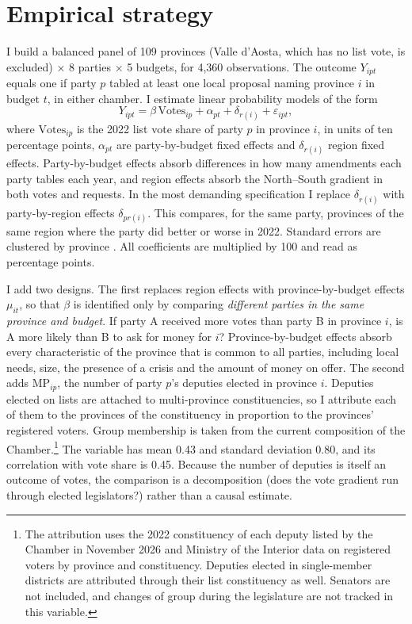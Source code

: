 \documentclass[12pt]{article}
\begin{document}
\section{Empirical strategy}\label{sec:strategy}

I build a balanced panel of 109 provinces (Valle d'Aosta, which has no list vote, is excluded) $\times$ 8 parties $\times$ 5 budgets, for 4,360 observations. The outcome $Y_{ipt}$ equals one if party $p$ tabled at least one local proposal naming province $i$ in budget $t$, in either chamber. I estimate linear probability models of the form
\begin{equation}
Y_{ipt} = \beta\, \text{Votes}_{ip} + \alpha_{pt} + \delta_{r(i)} + \varepsilon_{ipt},
\end{equation}
where $\text{Votes}_{ip}$ is the 2022 list vote share of party $p$ in province $i$, in units of ten percentage points, $\alpha_{pt}$ are party-by-budget fixed effects and $\delta_{r(i)}$ region fixed effects. Party-by-budget effects absorb differences in how many amendments each party tables each year, and region effects absorb the North--South gradient in both votes and requests. In the most demanding specification I replace $\delta_{r(i)}$ with party-by-region effects $\delta_{pr(i)}$. This compares, for the same party, provinces of the same region where the party did better or worse in 2022. Standard errors are clustered by province \citep{cameron2015}. All coefficients are multiplied by 100 and read as percentage points.

I add two designs. The first replaces region effects with province-by-budget effects $\mu_{it}$, so that $\beta$ is identified only by comparing \emph{different parties in the same province and budget}. If party A received more votes than party B in province $i$, is A more likely than B to ask for money for $i$? Province-by-budget effects absorb every characteristic of the province that is common to all parties, including local needs, size, the presence of a crisis and the amount of money on offer. The second adds $\text{MP}_{ip}$, the number of party $p$'s deputies elected in province $i$. Deputies elected on lists are attached to multi-province constituencies, so I attribute each of them to the provinces of the constituency in proportion to the provinces' registered voters. Group membership is taken from the current composition of the Chamber.\footnote{The attribution uses the 2022 constituency of each deputy listed by the Chamber in November 2026 and Ministry of the Interior data on registered voters by province and constituency. Deputies elected in single-member districts are attributed through their list constituency as well. Senators are not included, and changes of group during the legislature are not tracked in this variable.} The variable has mean 0.43 and standard deviation 0.80, and its correlation with vote share is 0.45. Because the number of deputies is itself an outcome of votes, the comparison is a decomposition (does the vote gradient run through elected legislators?) rather than a causal estimate.
\end{document}
